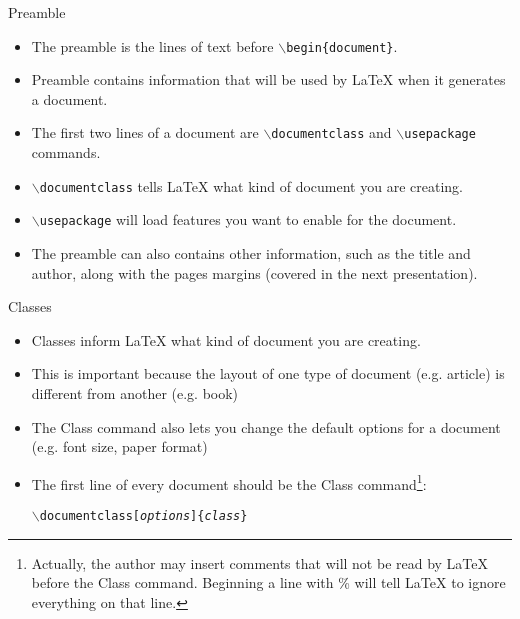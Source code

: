 \documentclass[pdf]{prosper}
\begin{document}
\begin{slide}{Preamble}
	\begin{itemize}
		\item The preamble is the lines of text before \texttt{$\backslash$begin\{document\}}.
		\item Preamble contains information that will be used by \LaTeX\mbox{} when it generates a document.
		\item The first two lines of a document are \texttt{$\backslash$documentclass} and \texttt{$\backslash$usepackage} commands.
		\item \texttt{$\backslash$documentclass} tells \LaTeX\mbox{} what kind of document you are creating.
		\item \texttt{$\backslash$usepackage} will load features you want to enable for the document.
		\item The preamble can also contains other information, such as the title and author, along with the pages margins (covered in the next presentation).
	\end{itemize}
\end{slide}
\begin{slide}{Classes}
	\begin{itemize}
		\item Classes inform \LaTeX\mbox{} what kind of document you are creating.
		\item This is important because the layout of one type of document (e.g. article) is different from another (e.g. book)
		\item The Class command also lets you change the default options for a document (e.g. font size, paper format)
		\item The first line of every document should be the Class command\footnote{Actually, the author may insert comments that will not be read by \LaTeX\mbox{} before the Class command. Beginning a line with \% will tell \LaTeX\mbox{} to ignore everything on that line.}:
			\begin{center}			
				\texttt{$\backslash$documentclass[\textit{options}]\{\textit{class}\}}
			\end{center}
	\end{itemize}
\end{slide}
\end{document}
